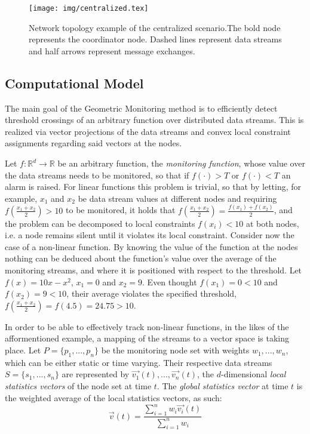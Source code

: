 \begin{figure}[H]
\centering
\texttt{[image: img/centralized.tex]}
\caption{Network topology example of the centralized scenario.The bold node represents the coordinator node. Dashed lines represent data streams and half arrows represent message exchanges.} 
\label{fig:centralized}
\end{figure}

\subsection{Computational Model} \label{subsec:theorBack-GM-compMod}

The main goal of the Geometric Monitoring method is to efficiently detect threshold crossings of an arbitrary function over distributed data streams. This is realized via vector projections of the data streams and convex local constraint assignments regarding said vectors at the nodes.

Let $f:\mathbb{R}^d \to \mathbb{R}$ be an arbitrary function, the \emph{monitoring function}, whose value over the data streams needs to be monitored, so that if $f(\cdot)>T$ or $f(\cdot)<T$ an alarm is raised. For linear functions this problem is trivial, so that by letting, for example, $x_1$ and $x_2$ be data stream values at different nodes and requiring $f(\frac{x_1+x_2}{2})>10$ to be monitored, it holds that $f(\frac{x_1+x_2}{2})=\frac{f(x_1)+f(x_2)}{2}$, and the problem can be decomposed to local constraints $f(x_i)<10$ at both nodes, i.e. a node remains silent until it violates its local constraint. Consider now the case of a non-linear function. By knowing the value of the function at the nodes nothing can be deduced about the function's value over the average of the monitoring streams, and where it is positioned with respect to the threshold. Let $f(x)=10x-x^2$, $x_1=0$ and $x_2=9$. Even thought $f(x_1)=0<10$ and $f(x_2)=9<10$, their average violates the specified threshold, $f(\frac{x_1+x_2}{2})=f(4.5)=24.75>10$. 

In order to be able to effectively track non-linear functions, in the likes of the afformentioned example, a mapping of the streams to a vector space is taking place. Let $P=\{p_1, ..., p_n\}$ be the monitoring node set with weights $w_1, ..., w_n$, which can be either static or time varying. Their respective data streams $S=\{s_1, ..., s_n\}$ are represented by $\vec{v_1}(t), ..., \vec{v_n}(t)$, the $d$-dimensional \emph{local statistics vectors} of the node set at time $t$. The \emph{global statistics vector} at time $t$ is the weighted average of the local statistics vectors, as such:
\begin{equation}
\vec{v}(t)=\frac{\sum_{i=1}^n{w_i\vec{v_i}(t)}}{\sum_{i=1}^n{w_i}}
\label{form:globalStatsVector}
\end{equation}

